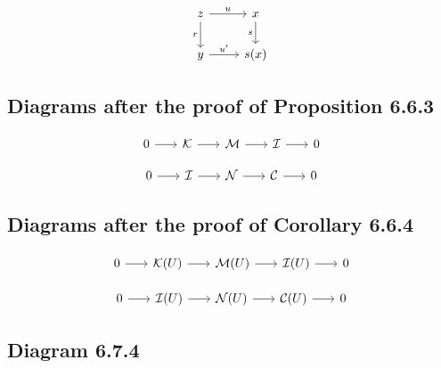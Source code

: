 \documentclass[leqno]{amsart}
\begin{document}
	\begin{equation*}
		\begin{tikzcd}
			z \arrow{r}{u} \arrow{d}[swap]{r} & x \arrow{d}[swap]{s} \\
			y \arrow{r}{u^{\prime}}  & s(x)
		\end{tikzcd}
	\end{equation*}

	\subsection*{Diagrams after the proof of Proposition 6.6.3}

	\begin{equation*}
		\begin{tikzcd}[sep=scriptsize]
			0 \arrow{r} & \mathcal{K} \arrow{r} & \mathcal{M} \arrow{r} & \mathcal{I} \arrow{r} & 0
		\end{tikzcd}
	\end{equation*}

	\begin{equation*}
		\begin{tikzcd}[sep=scriptsize]
			0 \arrow{r} & \mathcal{I} \arrow{r} & \mathcal{N} \arrow{r} & \mathcal{C} \arrow{r} & 0
		\end{tikzcd}
	\end{equation*}

	\subsection*{Diagrams after the proof of Corollary 6.6.4}

	\begin{equation*}
		\begin{tikzcd}[sep=scriptsize]
			0 \arrow{r} & \mathcal{K}(U) \arrow{r} & \mathcal{M}(U) \arrow{r} & \mathcal{I}(U) \arrow{r} & 0
		\end{tikzcd}
	\end{equation*}

	\begin{equation*}
		\begin{tikzcd}[sep=scriptsize]
			0 \arrow{r} & \mathcal{I}(U) \arrow{r} & \mathcal{N}(U) \arrow{r} & \mathcal{C}(U) \arrow{r} & 0
		\end{tikzcd}
	\end{equation*}

	\subsection*{Diagram 6.7.4}
\end{document}
